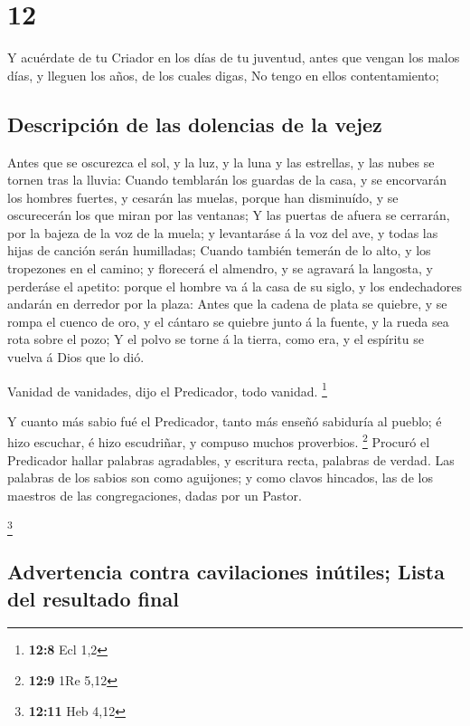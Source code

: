\hypertarget{section-11}{%
\section{12}\label{section-11}}

 Y acuérdate de tu Criador en los días de tu juventud, antes
que vengan los malos días, y lleguen los años, de los cuales digas, No
tengo en ellos contentamiento;

\hypertarget{descripciuxf3n-de-las-dolencias-de-la-vejez}{%
\subsection{Descripción de las dolencias de la
vejez}\label{descripciuxf3n-de-las-dolencias-de-la-vejez}}

 Antes que se oscurezca el sol, y la luz, y la luna y las
estrellas, y las nubes se tornen tras la lluvia:  Cuando
temblarán los guardas de la casa, y se encorvarán los hombres fuertes, y
cesarán las muelas, porque han disminuído, y se oscurecerán los que
miran por las ventanas;  Y las puertas de afuera se
cerrarán, por la bajeza de la voz de la muela; y levantaráse á la voz
del ave, y todas las hijas de canción serán humilladas; 
Cuando también temerán de lo alto, y los tropezones en el camino; y
florecerá el almendro, y se agravará la langosta, y perderáse el
apetito: porque el hombre va á la casa de su siglo, y los endechadores
andarán en derredor por la plaza:  Antes que la cadena de
plata se quiebre, y se rompa el cuenco de oro, y el cántaro se quiebre
junto á la fuente, y la rueda sea rota sobre el pozo;  Y el
polvo se torne á la tierra, como era, y el espíritu se vuelva á Dios que
lo dió.

 Vanidad de vanidades, dijo el Predicador, todo vanidad.
\footnote{\textbf{12:8} Ecl 1,2}

 Y cuanto más sabio fué el Predicador, tanto más enseñó
sabiduría al pueblo; é hizo escuchar, é hizo escudriñar, y compuso
muchos proverbios. \footnote{\textbf{12:9} 1Re 5,12} 
Procuró el Predicador hallar palabras agradables, y escritura recta,
palabras de verdad.  Las palabras de los sabios son como
aguijones; y como clavos hincados, las de los maestros de las
congregaciones, dadas por un Pastor.

\footnote{\textbf{12:11} Heb 4,12}

\hypertarget{advertencia-contra-cavilaciones-inuxfatiles-lista-del-resultado-final}{%
\subsection{Advertencia contra cavilaciones inútiles; Lista del
resultado
final}\label{advertencia-contra-cavilaciones-inuxfatiles-lista-del-resultado-final}}

